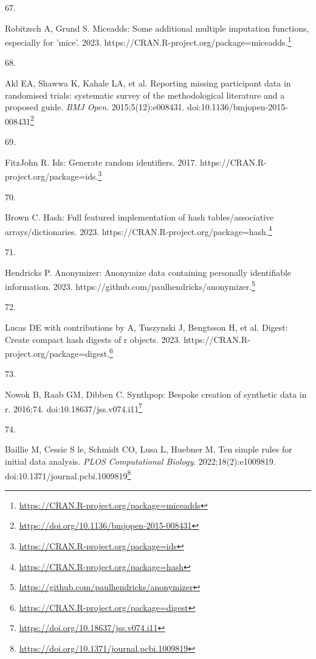 \documentclass[
  a4paper,
]{book}
\newlength{\cslhangindent}
\newlength{\csllabelwidth}
\newlength{\cslentryspacingunit} %
\newenvironment{CSLReferences}[2] %
 {%
  \setlength{\parindent}{0pt}
  \ifodd #1
  \let\oldpar\par
  \def\par{\hangindent=\cslhangindent\oldpar}
  \fi
  \setlength{\parskip}{#2\cslentryspacingunit}
 }%
 {}
\newcommand{\CSLLeftMargin}[1]{\parbox[t]{\csllabelwidth}{#1}}
\newcommand{\CSLRightInline}[1]{\parbox[t]{\linewidth - \csllabelwidth}{#1}\break}
\renewcommand{\href}[2]{#2\footnote{\url{#1}}}
\begin{document}
\begin{CSLReferences}{0}{0}
\leavevmode{}%
\CSLLeftMargin{67. }%
\CSLRightInline{Robitzsch A, Grund S. Miceadds: Some additional multiple imputation functions, especially for 'mice'. 2023. \href{https://CRAN.R-project.org/package=miceadds}{https://CRAN.R-project.org/package=miceadds.}}

\leavevmode{}%
\CSLLeftMargin{68. }%
\CSLRightInline{Akl EA, Shawwa K, Kahale LA, et al. Reporting missing participant data in randomised trials: systematic survey of the methodological literature and a proposed guide. \emph{BMJ Open}. 2015;5(12):e008431. doi:\href{https://doi.org/10.1136/bmjopen-2015-008431}{10.1136/bmjopen-2015-008431}}

\leavevmode{}%
\CSLLeftMargin{69. }%
\CSLRightInline{FitzJohn R. Ids: Generate random identifiers. 2017. \href{https://CRAN.R-project.org/package=ids}{https://CRAN.R-project.org/package=ids.}}

\leavevmode{}%
\CSLLeftMargin{70. }%
\CSLRightInline{Brown C. Hash: Full featured implementation of hash tables/associative arrays/dictionaries. 2023. \href{https://CRAN.R-project.org/package=hash}{https://CRAN.R-project.org/package=hash.}}

\leavevmode{}%
\CSLLeftMargin{71. }%
\CSLRightInline{Hendricks P. Anonymizer: Anonymize data containing personally identifiable information. 2023. \href{https://github.com/paulhendricks/anonymizer}{https://github.com/paulhendricks/anonymizer.}}

\leavevmode{}%
\CSLLeftMargin{72. }%
\CSLRightInline{Lucas DE with contributions by A, Tuszynski J, Bengtsson H, et al. Digest: Create compact hash digests of r objects. 2023. \href{https://CRAN.R-project.org/package=digest}{https://CRAN.R-project.org/package=digest.}}

\leavevmode{}%
\CSLLeftMargin{73. }%
\CSLRightInline{Nowok B, Raab GM, Dibben C. {\textbraceleft}Synthpop{\textbraceright}: Bespoke creation of synthetic data in {\textbraceleft}r{\textbraceright}. 2016;74. doi:\href{https://doi.org/10.18637/jss.v074.i11}{10.18637/jss.v074.i11}}

\leavevmode{}%
\CSLLeftMargin{74. }%
\CSLRightInline{Baillie M, Cessie S le, Schmidt CO, Lusa L, Huebner M. Ten simple rules for initial data analysis. \emph{PLOS Computational Biology}. 2022;18(2):e1009819. doi:\href{https://doi.org/10.1371/journal.pcbi.1009819}{10.1371/journal.pcbi.1009819}}


\end{CSLReferences}
\end{document}
